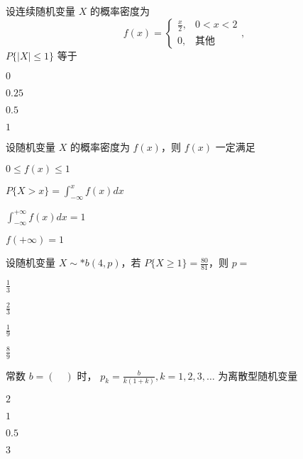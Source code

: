\documentclass{exam-zh}
\begin{document}
\begin{question}
  设连续随机变量 $X$ 的概率密度为  
  $$f(x) = 
  \begin{cases} 
  \frac{x}{2}, & 0 < x < 2 \\ 
  0, & \text{其他} 
  \end{cases},$$ $P\{|X|\leq 1\}$ 等于 \paren[B]
  \begin{choices}
    \item $0$  
    \item $0.25$  
    \item $0.5$  
    \item $1$  
  \end{choices}
\end{question}

\begin{question}
  设随机变量 $X$ 的概率密度为 $f(x)$，则 $f(x)$ 一定满足 \paren[C]
  \begin{choices}
    \item $0 \leq f(x) \leq 1$  
    \item $P\{X > x\} = \int_{-\infty}^{x} f(x) dx$  
    \item $\int_{-\infty}^{+\infty} f(x) dx = 1$  
    \item $f(+\infty) = 1$  
  \end{choices}
\end{question}

\begin{question}
  设随机变量 $X \sim* b(4, p)$，若 $P\{X \geq 1\} = \frac{80}{81}$，则  
  $p = $ \paren[B]
  \begin{choices}
    \item $\frac{1}{3}$  
    \item $\frac{2}{3}$  
    \item $\frac{1}{9}$  
    \item $\frac{8}{9}$  
  \end{choices}
\end{question}

\begin{question}
  常数 $b = ( \quad )$ 时，  
  $ p_k = \frac{b}{k(1+k)}, k=1,2,3,\ldots $  
  为离散型随机变量 \paren[B]
  \begin{choices}
    \item $2$  
    \item $1$  
    \item $0.5$  
    \item $3$  
  \end{choices}
\end{question}
\end{document}

